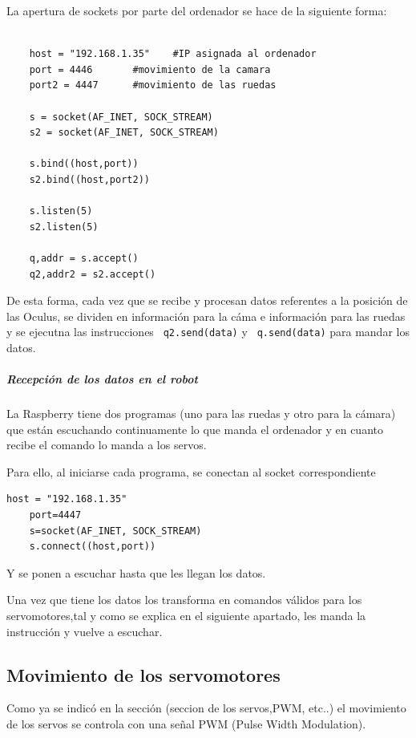 \documentclass[twoside, 11pt]{epstfg}
\begin{document}
La apertura de sockets por parte del ordenador se hace de la siguiente forma:

\lstset{language=python, breaklines=true, basicstyle=\footnotesize}
\begin{lstlisting}[frame=single]

	host = "192.168.1.35"    #IP asignada al ordenador
	port = 4446       #movimiento de la camara
	port2 = 4447      #movimiento de las ruedas

	s = socket(AF_INET, SOCK_STREAM)
	s2 = socket(AF_INET, SOCK_STREAM)

	s.bind((host,port))
	s2.bind((host,port2))

	s.listen(5)
	s2.listen(5)

	q,addr = s.accept()
	q2,addr2 = s2.accept()

\end{lstlisting}

De esta forma, cada vez que se recibe y procesan datos referentes a la posición de las Oculus, se dividen en información para la cáma e información para las ruedas y se ejecutna las instrucciones \texttt{ q2.send(data)}  y \texttt{ q.send(data)} para mandar los datos.
\subparagraph{Recepción de los datos en el robot}

La Raspberry tiene dos programas (uno para las ruedas y otro para la
cámara) que están escuchando continuamente lo que manda el ordenador y en
cuanto recibe el comando lo manda a los servos.

Para ello, al iniciarse cada programa, se conectan al socket correspondiente
\lstset{language=python, breaklines=true, basicstyle=\footnotesize}
\begin{lstlisting}[frame=single]
	host = "192.168.1.35"
	port=4447
	s=socket(AF_INET, SOCK_STREAM)
	s.connect((host,port))
\end{lstlisting}

Y se ponen a escuchar hasta que les llegan los datos.

Una vez que tiene los datos los transforma en comandos válidos para los servomotores,tal y como se explica en el siguiente apartado, les manda la instrucción y vuelve a escuchar.


\subsection{Movimiento de los servomotores}


Como ya se indicó en la sección (seccion de los servos,PWM, etc..) el movimiento de los servos se controla con una señal PWM (Pulse Width Modulation).
\end{document}

